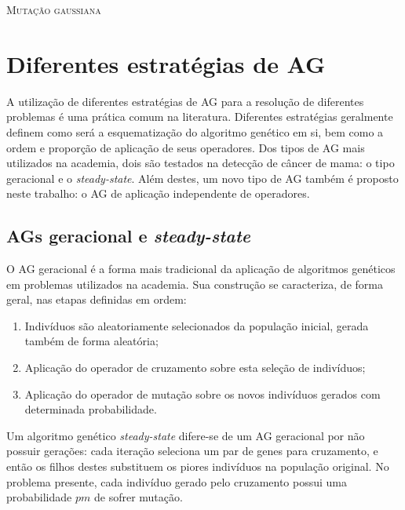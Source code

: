 \begin{algorithm}[!ht]
   \SetAlgoLined
   \caption{\textsc{Mutação gaussiana}}\label{alg:mutation}
 \end{algorithm}

\section{Diferentes estratégias de AG}
A utilização de diferentes estratégias de AG para a resolução de diferentes problemas é uma prática comum na literatura. Diferentes estratégias geralmente definem como será a esquematização do algoritmo genético em si, bem como a ordem e proporção de aplicação de seus operadores. Dos tipos de AG mais utilizados na academia, dois são testados na detecção de câncer de mama: o tipo geracional e o \textit{steady-state}. Além destes, um novo tipo de AG também é proposto neste trabalho: o AG de aplicação independente de operadores.

\subsection{AGs geracional e \textit{steady-state}}
\label{sec:ag}
O AG geracional é a forma mais tradicional da aplicação de algoritmos genéticos em problemas utilizados na academia. Sua construção se caracteriza, de forma geral, nas etapas definidas em ordem:
\begin{enumerate}
    \item Indivíduos são aleatoriamente selecionados da população inicial, gerada também de forma aleatória;
    \item Aplicação do operador de cruzamento sobre esta seleção de indivíduos;
    \item Aplicação do operador de mutação sobre os novos indivíduos gerados com determinada probabilidade.
\end{enumerate} 

Um algoritmo genético \textit{steady-state} difere-se de um AG geracional por não possuir gerações: cada iteração seleciona um par de genes para cruzamento, e então os filhos destes substituem os piores indivíduos na população original. No problema presente, cada indivíduo gerado pelo cruzamento possui uma probabilidade $pm$ de sofrer mutação.

